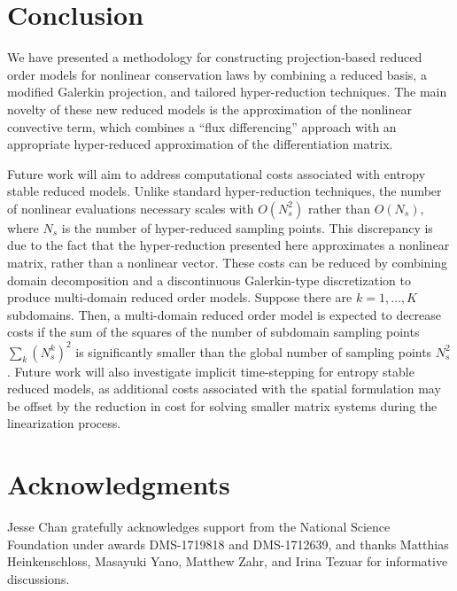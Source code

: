 \documentclass[preprint,10pt]{elsarticle}
\theoremstyle{definition}
\theoremstyle{lemma}
\theoremstyle{theorem}
\theoremstyle{assumption}
\begin{document}
\section{Conclusion}  We have presented a methodology for constructing projection-based reduced order models for nonlinear conservation laws by combining a reduced basis, a modified Galerkin projection, and tailored hyper-reduction techniques.  The main novelty of these new reduced models is the approximation of the nonlinear convective term, which combines a ``flux differencing'' approach with an appropriate hyper-reduced approximation of the differentiation matrix.  


Future work will aim to address computational costs associated with entropy stable reduced models.  Unlike standard hyper-reduction techniques, the number of nonlinear evaluations necessary scales with $O(N_s^2)$ rather than $O(N_s)$, where $N_s$ is the number of hyper-reduced sampling points.  This discrepancy is due to the fact that the hyper-reduction presented here approximates a nonlinear matrix, rather than a nonlinear vector.  These costs can be reduced by combining domain decomposition \cite{lucia2003reduced} and a discontinuous Galerkin-type discretization \cite{chan2017discretely} to produce multi-domain reduced order models.  Suppose there are $k = 1,\ldots, K$ subdomains.  Then, a multi-domain reduced order model is expected to decrease costs if the sum of the squares of the number of subdomain sampling points $\sum_k (N_s^k)^2$ is significantly smaller than the global number of sampling points $N_s^2$.  Future work will also investigate implicit time-stepping for entropy stable reduced models, as additional costs associated with the spatial formulation may be offset by the reduction in cost for solving smaller matrix systems during the linearization process.

\section{Acknowledgments}

Jesse Chan gratefully acknowledges support from the National Science Foundation under awards DMS-1719818 and DMS-1712639, and thanks Matthias Heinkenschloss, Masayuki Yano, Matthew Zahr, and Irina Tezuar for informative discussions.





\end{document}
